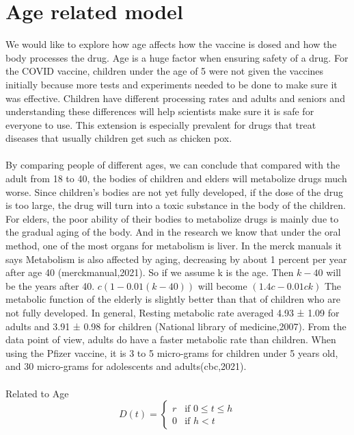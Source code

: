 \documentclass{article}
\begin{document}
\section*{Age related model}
We would like to explore how age affects how the vaccine is dosed and how the body processes the drug. Age is a huge factor when ensuring safety of a drug. For the COVID vaccine, children under the age of 5 were not given the vaccines initially because more tests and experiments needed to be done to make sure it was effective. Children have different processing rates and adults and seniors and understanding these differences will help scientists make sure it is safe for everyone to use. This extension is especially prevalent for drugs that treat diseases that usually children get such as chicken pox.\\
\\
By comparing people of different ages, we can conclude that compared with the adult from 18 to 40, the bodies of children and elders will metabolize drugs much worse. Since children's bodies are not yet fully developed, if the dose of the drug is too large, the drug will turn into a toxic substance in the body of the children. For elders, the poor ability of their bodies to metabolize drugs is mainly due to the gradual aging of the body. And in the research we know that under the oral method, one of the most organs for metabolism is liver. In the merck manuals it says Metabolism is also affected by aging, decreasing by about 1 percent per year after age 40 (merckmanual,2021). So if we assume k is the age. Then $k-40$ will be the years after 40. $c(1-0.01(k-40))$ will become $(1.4c-0.01ck)$ The metabolic function of the elderly is slightly better than that of children who are not fully developed. In general, Resting metabolic rate averaged 4.93 ± 1.09 for adults and 3.91 ± 0.98 for children (National library of medicine,2007). From the data point of view, adults do have a faster metabolic rate than children. When using the Pfizer vaccine, it is 3 to 5 micro-grams for children under 5 years old, and 30 micro-grams for adolescents and adults(cbc,2021).
\\
\\
Related to Age
\begin{equation}
  D(t) =
    \begin{cases}
      r & \text{if  $0 \leq t \leq h$}\\
      0 & \text{if $h< t$}
    \end{cases}       
\end{equation}
\end{document}
